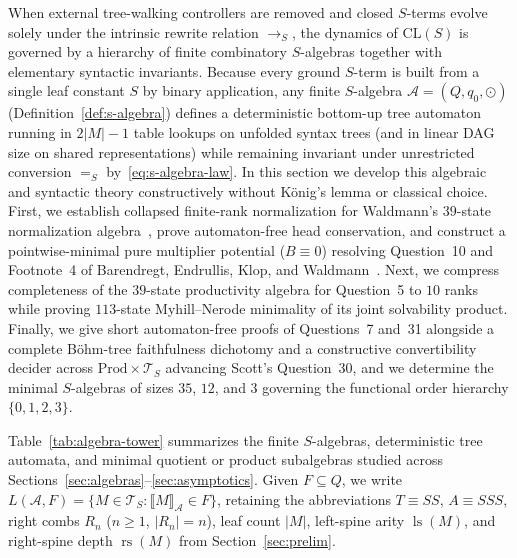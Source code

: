 \documentclass[11pt,reqno]{amsart}
\numberwithin{equation}{section}
\theoremstyle{plain}
\theoremstyle{definition}
\theoremstyle{remark}
\DeclareMathOperator{\ls}{ls}
\DeclareMathOperator{\rs}{rs}
\newcommand{\CLS}{\mathrm{CL}(S)}
\newcommand{\TS}{\mathcal{T}_S}
\newcommand{\Prod}{\mathrm{Prod}}
\newcommand{\sem}[1]{\llbracket #1 \rrbracket}
\newcommand{\redS}{\to_S}
\newcommand{\convS}{=_S}
\begin{document}
When external tree-walking controllers are removed and closed $S$-terms evolve solely under the intrinsic rewrite relation $\redS$, the dynamics of $\CLS$ is governed by a hierarchy of finite combinatory $S$-algebras together with elementary syntactic invariants. Because every ground $S$-term is built from a single leaf constant $S$ by binary application, any finite $S$-algebra $\mathcal{A} = (Q, q_0, \odot)$ (Definition~\ref{def:s-algebra}) defines a deterministic bottom-up tree automaton running in $2|M| - 1$ table lookups on unfolded syntax trees (and in linear DAG size on shared representations) while remaining invariant under unrestricted conversion $\convS$ by~\eqref{eq:s-algebra-law}. In this section we develop this algebraic and syntactic theory constructively without K\"onig's lemma or classical choice. First, we establish collapsed finite-rank normalization for Waldmann's $39$-state normalization algebra~\cite{Waldmann2000,BarendregtEndrullisKlopWaldmann2017}, prove automaton-free head conservation, and construct a pointwise-minimal pure multiplier potential ($B \equiv 0$) resolving Question~10 and Footnote~4 of Barendregt, Endrullis, Klop, and Waldmann~\cite{BarendregtEndrullisKlopWaldmann2017}. Next, we compress completeness of the $39$-state productivity algebra for Question~5 to $10$ ranks while proving $113$-state Myhill--Nerode minimality of its joint solvability product. Finally, we give short automaton-free proofs of Questions~7 and~31 alongside a complete B\"ohm-tree faithfulness dichotomy and a constructive convertibility decider across $\Prod \times \TS$ advancing Scott's Question~30, and we determine the minimal $S$-algebras of sizes $35$, $12$, and $3$ governing the functional order hierarchy $\{0, 1, 2, 3\}$.

Table~\ref{tab:algebra-tower} summarizes the finite $S$-algebras, deterministic tree automata, and minimal quotient or product subalgebras studied across Sections~\ref{sec:algebras}--\ref{sec:asymptotics}. Given $F \subseteq Q$, we write $L(\mathcal{A}, F) = \{ M \in \TS : \sem{M}_{\mathcal{A}} \in F \}$, retaining the abbreviations $T \equiv S S$, $A \equiv S S S$, right combs $R_n$ ($n \ge 1$, $|R_n| = n$), leaf count $|M|$, left-spine arity $\ls(M)$, and right-spine depth $\rs(M)$ from Section~\ref{sec:prelim}.
\end{document}
